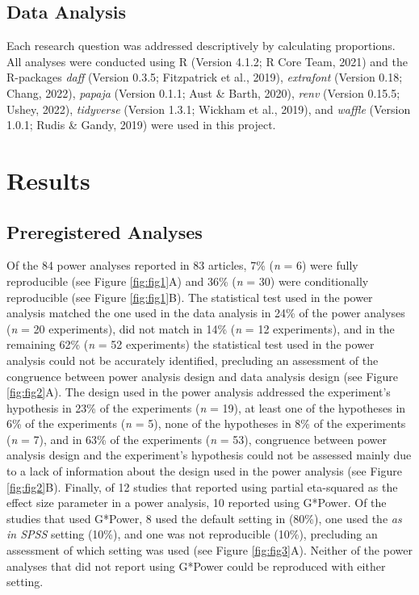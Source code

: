 \documentclass[
  man, donotrepeattitle,mask,floatsintext]{apa7}
\begin{document}
\hypertarget{data-analysis}{%
\subsection{Data Analysis}\label{data-analysis}}

Each research question was addressed descriptively by calculating proportions. All analyses were conducted using R (Version 4.1.2; R Core Team, 2021) and the R-packages \emph{daff} (Version 0.3.5; Fitzpatrick et al., 2019), \emph{extrafont} (Version 0.18; Chang, 2022), \emph{papaja} (Version 0.1.1; Aust \& Barth, 2020), \emph{renv} (Version 0.15.5; Ushey, 2022), \emph{tidyverse} (Version 1.3.1; Wickham et al., 2019), and \emph{waffle} (Version 1.0.1; Rudis \& Gandy, 2019) were used in this project.

\hypertarget{results}{%
\section{Results}\label{results}}

\hypertarget{preregistered-analyses}{%
\subsection{Preregistered Analyses}\label{preregistered-analyses}}

Of the 84 power analyses reported in 83 articles, 7\% (\emph{n} = 6) were fully reproducible (see Figure \ref{fig:fig1}A) and 36\% (\emph{n} = 30) were conditionally reproducible (see Figure \ref{fig:fig1}B). The statistical test used in the power analysis matched the one used in the data analysis in 24\% of the power analyses (\emph{n} = 20 experiments), did not match in 14\% (\emph{n} = 12 experiments), and in the remaining 62\% (\emph{n} = 52 experiments) the statistical test used in the power analysis could not be accurately identified, precluding an assessment of the congruence between power analysis design and data analysis design (see Figure \ref{fig:fig2}A). The design used in the power analysis addressed the experiment's hypothesis in 23\% of the experiments (\emph{n} = 19), at least one of the hypotheses in 6\% of the experiments (\emph{n} = 5), none of the hypotheses in 8\% of the experiments (\emph{n} = 7), and in 63\% of the experiments (\emph{n} = 53), congruence between power analysis design and the experiment's hypothesis could not be assessed mainly due to a lack of information about the design used in the power analysis (see Figure \ref{fig:fig2}B). Finally, of 12 studies that reported using partial eta-squared as the effect size parameter in a power analysis, 10 reported using G*Power. Of the studies that used G*Power, 8 used the default setting in (80\%), one used the \emph{as in SPSS} setting (10\%), and one was not reproducible (10\%), precluding an assessment of which setting was used (see Figure \ref{fig:fig3}A). Neither of the power analyses that did not report using G*Power could be reproduced with either setting.
\end{document}
